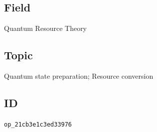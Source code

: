 \subsection*{Field}

Quantum Resource Theory

\subsection*{Topic}

Quantum state preparation; Resource conversion

\subsection*{ID}

\texttt{op\_21cb3e1c3ed33976}
